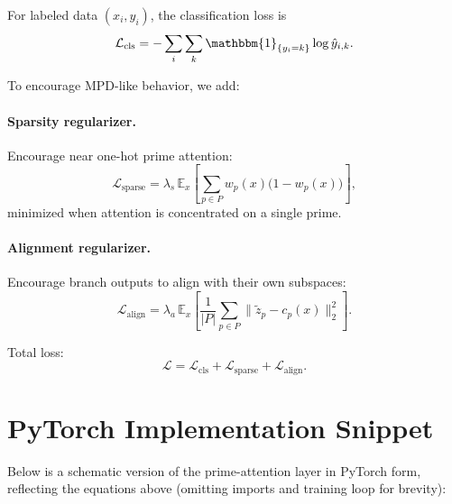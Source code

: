 \documentclass[11pt]{article}
\begin{document}
For labeled data $(x_i,y_i)$, the classification loss is
\[
\mathcal{L}_{\mathrm{cls}} = -\sum_i \sum_k \mathbbm{1}_{\{y_i=k\}} \log \hat{y}_{i,k}.
\]

To encourage MPD-like behavior, we add:

\paragraph{Sparsity regularizer.} Encourage near one-hot prime attention:
\[
\mathcal{L}_{\mathrm{sparse}} = \lambda_s\,\mathbb{E}_x\left[\sum_{p\in P} w_p(x)\big(1-w_p(x)\big)\right],
\]
minimized when attention is concentrated on a single prime.

\paragraph{Alignment regularizer.} Encourage branch outputs to align with their own subspaces:
\[
\mathcal{L}_{\mathrm{align}} = \lambda_a\,\mathbb{E}_x\left[\frac{1}{|P|}\sum_{p\in P}\|\tilde{z}_p - c_p(x)\|_2^2\right].
\]

Total loss:
\[
\mathcal{L} = \mathcal{L}_{\mathrm{cls}} + \mathcal{L}_{\mathrm{sparse}} + \mathcal{L}_{\mathrm{align}}.
\]

\section{PyTorch Implementation Snippet}

Below is a schematic version of the prime-attention layer in PyTorch form, reflecting the equations above (omitting imports and training loop for brevity):
\end{document}
